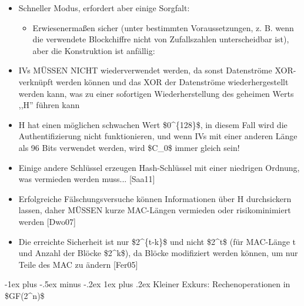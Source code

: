 \documentclass[a4paper]{article}
\makeatletter
\renewcommand{\subsubsection}{\@startsection{subsubsection}{3}{0mm}%
 {-1ex plus -.5ex minus -.2ex}%
 {1ex plus .2ex}%
 {\normalfont\small\bfseries}}
\makeatother
\begin{document}
\begin{multicols}{3}
\begin{itemize}
              \begin{itemize}
                  \item
                        Schneller Modus, erfordert aber einige Sorgfalt:

                        \begin{itemize}
                            \item
                                  Erwiesenermaßen sicher (unter bestimmten Voraussetzungen, z. B.
                                  wenn die verwendete Blockchiffre nicht von Zufallszahlen
                                  unterscheidbar ist), aber die Konstruktion ist anfällig:
                        \end{itemize}
                  \item
                        IVs MÜSSEN NICHT wiederverwendet werden, da sonst Datenströme
                        XOR-verknüpft werden können und das XOR der Datenströme
                        wiederhergestellt werden kann, was zu einer sofortigen
                        Wiederherstellung des geheimen Werts ,,H'' führen kann
                  \item
                        H hat einen möglichen schwachen Wert \$0\^{}\{128\}\$, in diesem
                        Fall wird die Authentifizierung nicht funktionieren, und wenn IVs
                        mit einer anderen Länge als 96 Bits verwendet werden, wird \$C\_0\$
                        immer gleich sein!
                  \item
                        Einige andere Schlüssel erzeugen Hash-Schlüssel mit einer niedrigen
                        Ordnung, was vermieden werden muss... {[}Saa11{]}
                  \item
                        Erfolgreiche Fälschungsversuche können Informationen über H
                        durchsickern lassen, daher MÜSSEN kurze MAC-Längen vermieden oder
                        risikominimiert werden {[}Dwo07{]}
                  \item
                        Die erreichte Sicherheit ist nur \$2\^{}\{t-k\}\$ und nicht
                        \$2\^{}t\$ (für MAC-Länge t und Anzahl der Blöcke \$2\^{}k\$), da
                        Blöcke modifiziert werden können, um nur Teile des MAC zu ändern
                        {[}Fer05{]}
              \end{itemize}
    \end{itemize}


    \subsubsection{Kleiner Exkurs: Rechenoperationen in
    \$GF(2\^{}n)\$}


\end{multicols}
\end{document}
